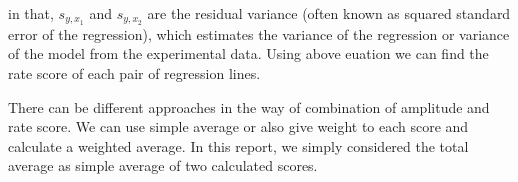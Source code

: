 in that, $s_{y,x_1}$ and $s_{y,x_2}$ are the residual variance (often known as squared standard error of the regression), which estimates the variance of the regression or variance of the model from the experimental data. Using above euation we can find the rate score of each pair of regression lines.

There can be different approaches in the way of combination of amplitude and rate score. We can use simple average or also give weight to each score and calculate a weighted average. In this report, we simply considered the total average as simple average of two calculated scores.  


